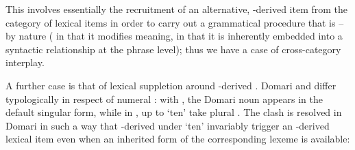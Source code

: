 \documentclass[output=paper]{langsci/langscibook}
\begin{document}

This  involves essentially the recruitment of an alternative, -derived item from the category of lexical items in order to carry out a grammatical procedure that is – by nature ( in that it modifies meaning,  in that it is inherently embedded into a syntactic relationship at the phrase level); thus we have a case of cross-category interplay.

A further case is that of lexical suppletion around -derived . Domari and  differ typologically in respect of numeral : with  , the Domari noun appears in the default singular form, while in ,  up to `ten' take plural . The clash is resolved in Domari in such a way that -derived  under `ten' invariably trigger an -derived lexical item even when an inherited form of the corresponding lexeme is available:
\end{document}
